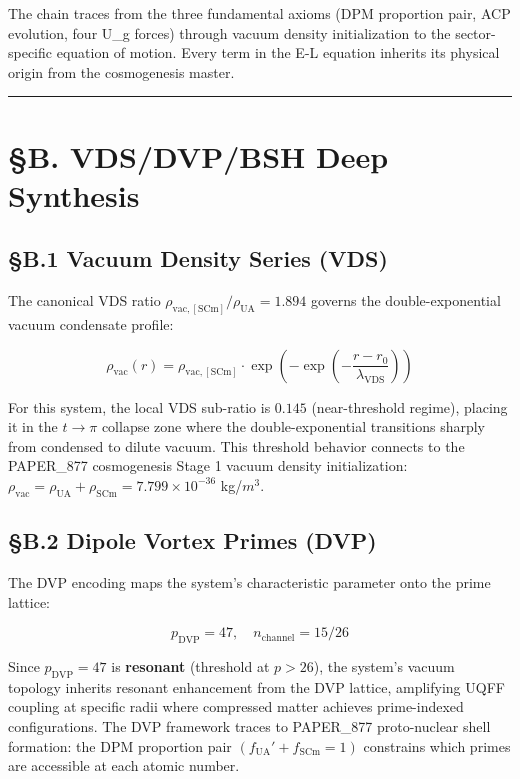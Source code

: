 \documentclass[12pt,a4paper]{article}
\begin{document}
The chain traces from the three fundamental axioms (DPM proportion pair, ACP evolution, four U\_g forces) through vacuum density initialization to the sector-specific equation of motion. Every term in the E-L equation inherits its physical origin from the cosmogenesis master.

\medskip\hrule\medskip

\section{\S{}B. VDS/DVP/BSH Deep Synthesis}

\subsection{\S{}B.1 Vacuum Density Series (VDS)}

The canonical VDS ratio $\rho_{\mathrm{vac,[SCm]}} / \rho_{\mathrm{UA}} = 1.894$ governs the double-exponential vacuum condensate profile:

\begin{equation}
\rho_{\mathrm{vac}}(r) = \rho_{\mathrm{vac,[SCm]}} \cdot \exp\!\left(-\exp\!\left(-\frac{r - r_0}{\lambda_{\mathrm{VDS}}}\right)\right)
\end{equation}

For this system, the local VDS sub-ratio is $0.145$ (near-threshold regime), placing it in the $t \to \pi$ collapse zone where the double-exponential transitions sharply from condensed to dilute vacuum. This threshold behavior connects to the PAPER\_877 cosmogenesis Stage 1 vacuum density initialization: $\rho_{\mathrm{vac}} = \rho_{\mathrm{UA}} + \rho_{\mathrm{SCm}} = 7.799 \times 10^{-36}$ kg/$m^{3}$.

\subsection{\S{}B.2 Dipole Vortex Primes (DVP)}

The DVP encoding maps the system's characteristic parameter onto the prime lattice:

\begin{equation}
p_{\mathrm{DVP}} = 47, \quad n_{\mathrm{channel}} = 15/26
\end{equation}

Since $p_{\mathrm{DVP}} = 47$ is \textbf{resonant} (threshold at $p > 26$), the system's vacuum topology inherits resonant enhancement from the DVP lattice, amplifying UQFF coupling at specific radii where compressed matter achieves prime-indexed configurations. The DVP framework traces to PAPER\_877 proto-nuclear shell formation: the DPM proportion pair $(f_{\mathrm{UA}}' + f_{\mathrm{SCm}} = 1)$ constrains which primes are accessible at each atomic number.
\end{document}
